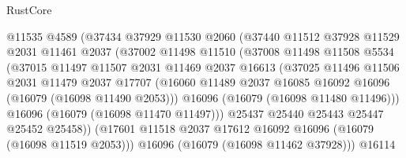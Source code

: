 \begin{lexlean}{RustCore}
\begin{coremodule}
                          @11535
                          @4589
                          (@37434
                            @37929
                            @11530
                            @2060
                            (@37440
                              @11512
                              @37928
                              @11529
                              @2031
                              @11461
                              @2037
                              (@37002
                                @11498
                                @11510
                                (@37008
                                  @11498
                                  @11508
                                  @5534
                                  (@37015
                                    @11497
                                    @11507
                                    @2031
                                    @11469
                                    @2037
                                    @16613
                                    (@37025
                                      @11496
                                      @11506
                                      @2031
                                      @11479
                                      @2037
                                      @17707
                                      (@16060
                                        @11489
                                        @2037
                                        @16085
                                        @16092
                                        @16096
                                        (@16079 (@16098 @11490 @2053)))
                                      @16096
                                      (@16079 (@16098 @11480 @11496)))
                                    @16096
                                    (@16079 (@16098 @11470 @11497)))
                                  @25437
                                  @25440
                                  @25443
                                  @25447
                                  @25452
                                  @25458))
                              (@17601
                                @11518
                                @2037
                                @17612
                                @16092
                                @16096
                                (@16079 (@16098 @11519 @2053)))
                              @16096
                              (@16079 (@16098 @11462 @37928)))
                            @16114

\end{coremodule}
\end{lexlean}
